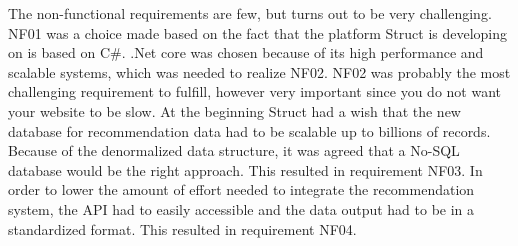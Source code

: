 The non-functional requirements are few, but turns out to be very challenging. NF01 was a choice made based on the fact that the platform Struct is developing on is based on C\#. .Net core was chosen because of its high performance and scalable systems, which was needed to realize NF02.\cite{NetCore}
NF02 was probably the most challenging requirement to fulfill, however very important since you do not want your website to be slow. At the beginning Struct had a wish that the new database for recommendation data had to be scalable up to billions of records. Because of the denormalized data structure, it was agreed that a No-SQL database would be the right approach. This resulted in requirement NF03. In order to lower the amount of effort needed to integrate the recommendation system, the API had to easily accessible and the data output had to be in a standardized format. This resulted in requirement NF04.
